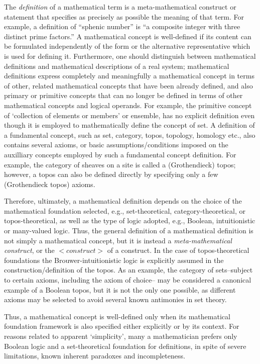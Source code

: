 \documentclass[12pt]{article}
\begin{document}
The {\em definition} of a mathematical term is a meta-mathematical construct or statement that specifies as precisely as possible the meaning of that term. For example, a definition of ``sphenic number'' is ``a composite integer with three distinct prime factors.'' A mathematical concept is well-defined if its content can be formulated independently of the form or the alternative representative which is used for defining it. Furthermore, one should distinguish between mathematical definitions and mathematical descriptions of a real system; mathematical definitions express completely and meaningfully a mathematical concept in terms of other, related mathematical concepts that have been already defined, and also primary or primitive concepts that can no longer be defined in terms of other mathematical concepts and logical operands. For example, the primitive concept of `collection of elements or members' or ensemble, has no explicit definition even though it is employed to mathematically define the concept of set. A definition of a fundamental concept, such as set, category, topos, topology, homology etc., also contains several axioms, or basic assumptions/conditions imposed on the auxilliary concepts employed by such a fundamental concept definition. For example, the category of sheaves on a site is called a (Grothendieck) topos; however, a topos can also be defined directly by specifying only a few (Grothendieck topos) axioms.

 Therefore, ultimately, a mathematical definition depends on the choice of the mathematical foundation selected, e.g., set-theoretical, category-theoretical, or topos-theoretical, as well as the type of logic adopted, e.g., Boolean, intuitionistic or many-valued logic. Thus, the general definition of a mathematical definition is not simply a mathematical concept, but it is instead a {\em meta-mathematical construct}, or the $<construct>$ of a construct. In the case of topos-theoretical foundations the Brouwer-intuitionistic logic is explicitly assumed in the construction/definition of the topos. As an example, the category of sets--subject to certain axioms, including the axiom of choice-- may be considered a canonical example of a Boolean topos, but it is not the only one possible, as different axioms may be selected to avoid several known antimonies in set theory. 
 
 Thus, a mathematical concept is well-defined only when its mathematical foundation framework is also specified either explicitly or by its context. For reasons related to apparent `simplicity', many a mathematician prefers only Boolean logic and a set-theoretical foundation for definitions, in spite of severe limitations, known inherent paradoxes and incompleteness.
\end{document}

